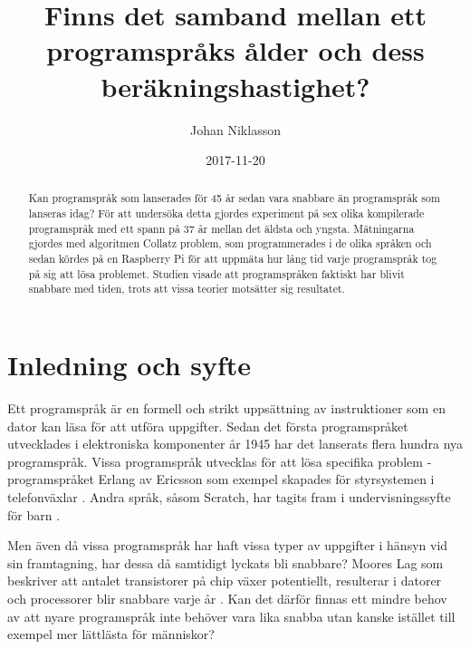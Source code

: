 \documentclass[12pt,swedish]{article}
\title{Finns det samband mellan ett programspråks ålder och dess beräkningshastighet?}
\author{Johan Niklasson}
\date{2017-11-20}
\begin{document}

\maketitle
\normalsize
\begin{center}

\begin{abstract}
Kan programspråk som lanserades för 45 år sedan vara snabbare än programspråk som lanseras idag? För att undersöka detta gjordes experiment på sex olika kompilerade programspråk med ett spann på 37 år mellan det äldsta och yngsta. Mätningarna gjordes med algoritmen Collatz problem, som programmerades i de olika språken och sedan kördes på en Raspberry Pi för att uppmäta hur lång tid varje programspråk tog på sig att lösa problemet. Studien visade att programspråken faktiskt har blivit snabbare med tiden, trots att vissa teorier motsätter sig resultatet.
\end{abstract}
\end{center}
\clearpage


\tableofcontents

\listoftables
\listoffigures
\clearpage


\section{Inledning och syfte}
Ett programspråk är en formell och strikt uppsättning av instruktioner som en dator kan läsa för att utföra uppgifter. Sedan det första programspråket utvecklades i elektroniska komponenter år 1945 \citep{bauer_wossner_1972} har det lanserats flera hundra nya programspråk. Vissa programspråk utvecklas för att lösa specifika problem - programspråket Erlang av Ericsson som exempel skapades för styrsystemen i telefonväxlar \citep{armstrong_1997}. Andra språk, såsom Scratch, har tagits fram i undervisningssyfte för barn \citep{maloney_resnick_rusk_silverman_eastmond_2010}.

Men även då vissa programspråk har haft vissa typer av uppgifter i hänsyn vid sin framtagning, har dessa då samtidigt lyckats bli snabbare? Moores Lag som beskriver att antalet transistorer på chip växer potentiellt, resulterar i datorer och processorer blir snabbare varje år \citep{schaller_1997}. Kan det därför finnas ett mindre behov av att nyare programspråk inte behöver vara lika snabba utan kanske istället till exempel mer lättlästa för människor?
\end{document}
